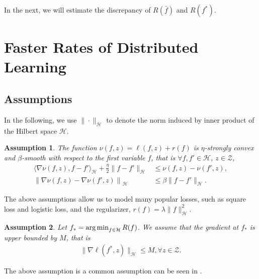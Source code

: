 \documentclass{article}
\newcommand{\argmin}{\operatornamewithlimits{arg\,min}}
\newtheorem{assumption}{Assumption}
\begin{document}
In the next, we will estimate the discrepancy of $R(\bar{f})$ and $R(f^\ast)$.
\section{Faster Rates of Distributed Learning}
\subsection{Assumptions}
In the following, we use $\|\cdot\|_\mathcal{H}$ to denote the norm induced by inner product of the Hilbert space $\mathcal{H}$.
\begin{assumption}
\label{assumption-strongly-convex}
  The function $\nu(f,z)=\ell(f,z)+r(f)$ is $\eta$-strongly convex and $\beta$-smooth with respect to the first variable $f$,
  that is $\forall f,f'\in\mathcal{H}$, $z\in\mathcal{Z}$,
  \begin{align}
    \label{assumption-strongly}
     \langle \nabla \nu(f,z), f-f'\rangle_\mathcal{H}+\frac{\eta}{2}\|f-f'\|_\mathcal{H} &\leq \nu(f,z)-\nu(f',z),\\
     \label{assumption-smooth}
     \left\|\nabla\nu(f,z)-\nabla \nu(f',z)\right\|_\mathcal{H}&\leq \beta\|f-f'\|_\mathcal{H}.
  \end{align}
\end{assumption}
The above assumptions allow us to model many popular losses,
such as square loss and logistic loss, and the regularizer, $r(f)=\lambda \|f\|_\mathcal{H}^2$.
\begin{assumption}
\label{assumption-optimal-bound}
  Let $f_\ast=\argmin_{f\in\mathcal{H}}R(f)$. We assume that the gradient at $f_\ast$ is upper bounded by $M$, that is
  \begin{align*}
    \|\nabla \ell(f^\ast,z)\|_\mathcal{H}\leq M, \forall z\in\mathcal{Z}.
  \end{align*}
\end{assumption}
The above assumption is a common assumption can be seen in \cite{zhang2012communication,Zhang2017er}.
\end{document}
